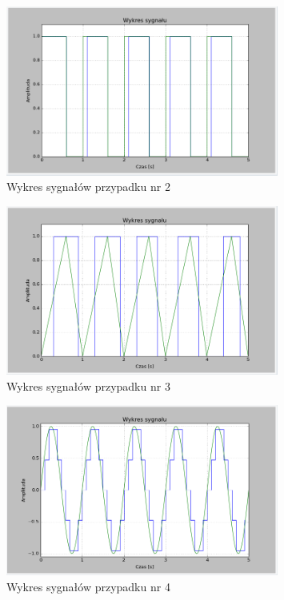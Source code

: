 \documentclass{article}
\begin{document}
    \begin{figure}[h!]
        \centering
        \includegraphics[width=0.8\textwidth]{img/1/quad_rect_2.png}
        \caption{Wykres sygnałów przypadku nr 2}
    \end{figure}
    \FloatBarrier

    \begin{figure}[h!]
        \centering
        \includegraphics[width=0.8\textwidth]{img/1/quad_tri_2.png}
        \caption{Wykres sygnałów przypadku nr 3}
    \end{figure}
    \FloatBarrier

    \begin{figure}[h!]
        \centering
        \includegraphics[width=0.8\textwidth]{img/1/quad_sin_5.png}
        \caption{Wykres sygnałów przypadku nr 4}
    \end{figure}
    \FloatBarrier
\end{document}
